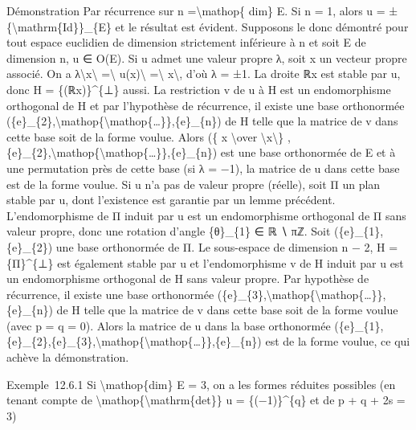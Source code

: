 \documentclass[]{article}
\begin{document}
Démonstration Par récurrence sur n =\textbackslash{}mathop\{ dim\} E. Si
n = 1, alors u = ±\{\textbackslash{}mathrm\{Id\}\}\_\{E\} et le résultat
est évident. Supposons le donc démontré pour tout espace euclidien de
dimension strictement inférieure à n et soit E de dimension n, u ∈ O(E).
Si u admet une valeur propre λ, soit x un vecteur propre associé. On a
\textbar{}λ\textbar{}\textbackslash{}\textbar{}x\textbackslash{}\textbar{}
=\textbackslash{}\textbar{} u(x)\textbackslash{}\textbar{}
=\textbackslash{}\textbar{} x\textbackslash{}\textbar{}, d'où λ = ±1. La
droite ℝx est stable par u, donc H = \{(ℝx)\}\^{}\{⊥\} aussi. La
restriction v de u à H est un endomorphisme orthogonal de H et par
l'hypothèse de récurrence, il existe une base orthonormée
(\{e\}\_\{2\},\textbackslash{}mathop\{\textbackslash{}mathop\{\ldots{}\}\},\{e\}\_\{n\})
de H telle que la matrice de v dans cette base soit de la forme voulue.
Alors (\{ x \textbackslash{}over
\textbackslash{}\textbar{}x\textbackslash{}\textbar{}\}
,\{e\}\_\{2\},\textbackslash{}mathop\{\textbackslash{}mathop\{\ldots{}\}\},\{e\}\_\{n\})
est une base orthonormée de E et à une permutation près de cette base
(si λ = −1), la matrice de u dans cette base est de la forme voulue. Si
u n'a pas de valeur propre (réelle), soit Π un plan stable par u, dont
l'existence est garantie par un lemme précédent. L'endomorphisme de Π
induit par u est un endomorphisme orthogonal de Π sans valeur propre,
donc une rotation d'angle \{θ\}\_\{1\} ∈ ℝ ∖ πℤ. Soit
(\{e\}\_\{1\},\{e\}\_\{2\}) une base orthonormée de Π. Le sous-espace de
dimension n − 2, H = \{Π\}\^{}\{⊥\} est également stable par u et
l'endomorphisme v de H induit par u est un endomorphisme orthogonal de H
sans valeur propre. Par hypothèse de récurrence, il existe une base
orthonormée
(\{e\}\_\{3\},\textbackslash{}mathop\{\textbackslash{}mathop\{\ldots{}\}\},\{e\}\_\{n\})
de H telle que la matrice de v dans cette base soit de la forme voulue
(avec p = q = 0). Alors la matrice de u dans la base orthonormée
(\{e\}\_\{1\},\{e\}\_\{2\},\{e\}\_\{3\},\textbackslash{}mathop\{\textbackslash{}mathop\{\ldots{}\}\},\{e\}\_\{n\})
est de la forme voulue, ce qui achève la démonstration.

Exemple~12.6.1 Si \textbackslash{}mathop\{dim\} E = 3, on a les formes
réduites possibles (en tenant compte de
\textbackslash{}mathop\{\textbackslash{}mathrm\{det\}\} u =
\{(−1)\}\^{}\{q\} et de p + q + 2s = 3)
\end{document}
